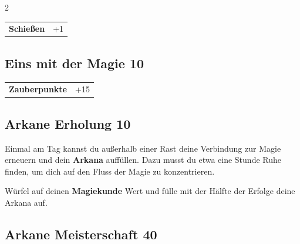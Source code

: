 \begin{multicols}{2}
\begin{tcolorbox}
\begin{tabular}{@{}ll@{}}
    \textbf{Schießen} & +1\\
\end{tabular}


\end{tcolorbox}

\begin{tcolorbox}
    \subsection*{Eins mit der Magie \hfill \small{10 }}
    \tcblower




\begin{tabular}{@{}ll@{}}
    \textbf{Zauberpunkte} & +15\\
\end{tabular}


\end{tcolorbox}

\begin{tcolorbox}
    \subsection*{Arkane Erholung \hfill \small{10 }}
    \tcblower
Einmal am Tag kannst du außerhalb einer Rast deine Verbindung zur Magie erneuern und dein \textbf{Arkana} auffüllen. Dazu musst du etwa eine Stunde Ruhe finden, um dich auf den Fluss der Magie zu konzentrieren.

Würfel auf deinen \textbf{Magiekunde} Wert und fülle mit der Hälfte der Erfolge deine Arkana auf.


\vspace{3mm}



\end{tcolorbox}

\begin{tcolorbox}
    \subsection*{Arkane Meisterschaft \hfill \small{40 }}
    \tcblower





\end{tcolorbox}
\end{multicols}
